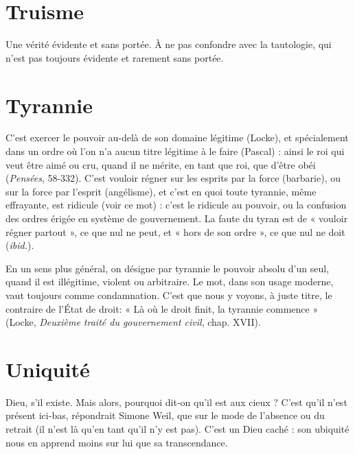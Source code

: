 \section{Truisme}
Une vérité évidente et sans portée. À ne pas confondre avec la
tautologie, qui n’est pas toujours évidente et rarement sans portée.

\section{Tyrannie}
C'est exercer le pouvoir au-delà de son domaine légitime
(Locke), et spécialement dans un ordre où l’on n’a aucun titre
légitime à le faire (Pascal) : ainsi le roi qui veut être aimé ou cru, quand il ne
mérite, en tant que roi, que d’être obéi ({\it Pensées}, 58-332). C’est vouloir régner
sur les esprits par la force (barbarie), ou sur la force par l'esprit (angélisme), et
c’est en quoi toute tyrannie, même effrayante, est ridicule (voir ce mot) : c’est
le ridicule au pouvoir, ou la confusion des ordres érigée en système de gouvernement.
La faute du tyran est de « vouloir régner partout », ce que nul ne peut,
et « hors de son ordre », ce que nul ne doit ({\it ibid.}).

En un sens plus général, on désigne par tyrannie le pouvoir absolu d’un
seul, quand il est illégitime, violent ou arbitraire. Le mot, dans son usage
moderne, vaut toujours comme condamnation. C’est que nous y voyons, à
juste titre, le contraire de l’État de droit: « Là où le droit finit, la tyrannie
commence » (Locke, {\it Deuxième traité du gouvernement civil}, chap. XVII).

\section{Uniquité}
Dieu, s’il existe. Mais alors, pourquoi dit-on qu’il est aux
cieux ? C’est qu’il n’est présent ici-bas, répondrait Simone Weil, que sur le
mode de l'absence ou du retrait (il n’est là qu’en tant qu’il n’y est pas). C’est un
Dieu caché : son ubiquité nous en apprend moins sur lui que sa transcendance.


